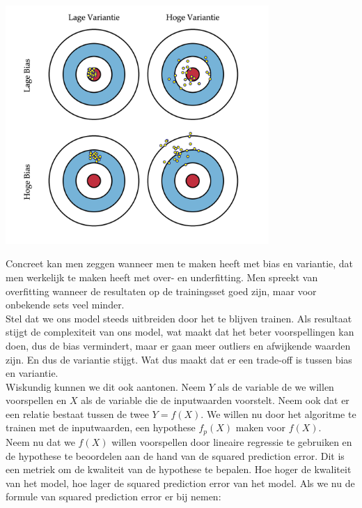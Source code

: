 %
\begin{center}
  \includegraphics[width=10cm]{bulls-eye}
\end{center}
\newline
Concreet kan men zeggen wanneer men te maken heeft met bias en variantie, dat men werkelijk te maken heeft met over- en underfitting. Men spreekt van overfitting wanneer de resultaten op de trainingsset goed zijn, maar voor onbekende sets veel minder.\\
Stel dat we ons model steeds uitbreiden door het te blijven trainen. Als resultaat stijgt de complexiteit van ons model, wat maakt dat het beter voorspellingen kan doen, dus de bias vermindert, maar er gaan meer outliers en afwijkende waarden zijn. En dus de variantie stijgt. Wat dus maakt dat er een trade-off is tussen bias en variantie.\\ 
%
Wiskundig kunnen we dit ook aantonen. Neem $Y$ als de variable de we willen voorspellen en $X$ als de variable die de inputwaarden voorstelt. Neem ook dat er een relatie bestaat tussen de twee $Y=f(X)$. We willen nu door het algoritme te trainen met de inputwaarden, een hypothese $f_{p}(X)$ maken voor $f(X)$. \\
Neem nu dat we $f(X)$ willen voorspellen door lineaire regressie te gebruiken en de hypothese te beoordelen aan de hand van de squared prediction error. Dit is een metriek om de kwaliteit van de hypothese te bepalen. Hoe hoger de kwaliteit van het model, hoe lager de squared prediction error van het model. Als we nu de formule van squared prediction error er bij nemen:

